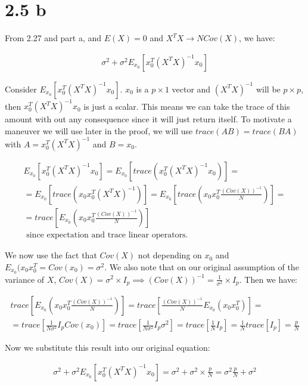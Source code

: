 \section*{2.5 b}

\noindent
From 2.27 and part a, and $E(X) = 0$ and $X^{T} X \rightarrow N Cov(X)$, we 
have:

\begin{gather*}
\sigma^{2} + \sigma^{2} E_{x_{0}}[x_{0}^{T} (X^{T} X)^{-1} x_{0}]
\end{gather*}

\noindent
Consider $E_{x_{0}}[x_{0}^{T} (X^{T} X)^{-1} x_{0}]$. $x_{0}$ is a $p \times 1$ 
vector and $(X^{T} X)^{-1}$ will be $p \times p$, then 
$x_{0}^{T} (X^{T} X)^{-1} x_{0}$ is just a scalar. This means we can take the 
trace of this amount with out any consequence since it will just return itself. 
To motivate a maneuver we will use later in the proof, we will use 
$trace(A B) = trace(B A)$ with $A = x_{0}^{T} (X^{T} X)^{-1}$ and 
$B = x_{0}$.

\begin{gather*}
E_{x_{0}}[x_{0}^{T} (X^{T} X)^{-1} x_{0}] = 
E_{x_{0}}[trace(x_{0}^{T} (X^{T} X)^{-1} x_{0})] = \\
=
E_{x_{0}}[trace(x_{0} x_{0}^{T} (X^{T} X)^{-1})] = 
E_{x_{0}}[trace(x_{0} x_{0}^{T} \frac{(Cov(X))^{-1}}{N})] = \\
=
trace[E_{x_{0}}(x_{0} x_{0}^{T} \frac{(Cov(X))^{-1}}{N})] \\
\text{ since expectation and trace linear operators.}
\end{gather*}

\noindent
We now use the fact that $Cov(X)$ not depending on $x_{0}$ and 
$E_{x_{0}}(x_{0} x_{0}^{T} = Cov(x_{0}) = \sigma^{2}$. We also note that on our 
original assumption of the variance of $X$, $Cov(X) = \sigma^{2} \times I_{p} 
\implies (Cov(X))^{-1} = \frac{1}{\sigma^{2}} \times I_{p}$. Then we have: 

\begin{gather*}
trace[E_{x_{0}}(x_{0} x_{0}^{T} \frac{(Cov(X))^{-1}}{N})] = 
trace[\frac{(Cov(X))^{-1}}{N} E_{x_{0}}(x_{0} x_{0}^{T})] = \\
=
trace[\frac{1}{N \sigma^{2}} I_{p} Cov(x_{0})] = 
trace[\frac{1}{N \sigma^{2}} I_{p} \sigma^{2}] = 
trace[\frac{1}{N} I_{p}] = 
\frac{1}{N} trace[I_{p}] = 
\frac{p}{N}
\end{gather*}

\noindent
Now we substitute this result into our original equation:

\begin{gather*}
\sigma^{2} + \sigma^{2} E_{x_{0}}[x_{0}^{T} (X^{T} X)^{-1} x_{0}] = 
\sigma^{2} + \sigma^{2} \times \frac{p}{N} = 
\sigma^{2} \frac{p}{N} + \sigma^{2}
\end{gather*}